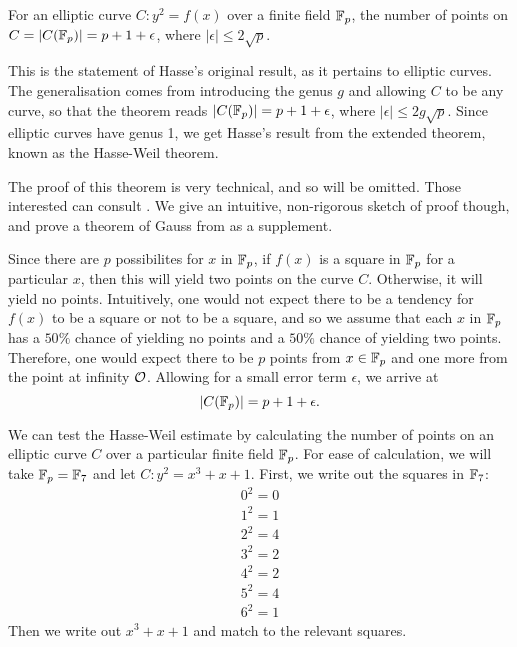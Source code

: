 
\begin{theorem}
	For an elliptic curve $C: y^2 = f(x)$ over a finite field $\fp$, the number of points on $C = |C(\fp)| = p + 1 + \epsilon$, where $|\epsilon| \leq 2\sqrt{p}$.
\end{theorem}
This is the statement of Hasse's original result, as it pertains to elliptic curves.
The generalisation comes from introducing the genus $g$ and allowing $C$ to be any curve, so that the theorem reads $|C(\fp)| = p + 1 + \epsilon$, where $|\epsilon| \leq 2g\sqrt{p}$.
Since elliptic curves have genus 1, we get Hasse's result from the extended theorem, known as the Hasse-Weil theorem.
\begin{sproof}
	The proof of this theorem is very technical, and so will be omitted.
	Those interested can consult \cite{hasse1936a,hasse1936b,hasse1936c}.
	We give an intuitive, non-rigorous sketch of proof though, and prove a theorem of Gauss from \cite{tate2013} as a supplement.

	Since there are $p$ possibilites for $x$ in $\fp$, if $f(x)$ is a square in $\fp$ for a particular $x$, then this will yield two points on the curve $C$.
	Otherwise, it will yield no points.
	Intuitively, one would not expect there to be a tendency for $f(x)$ to be a square or not to be a square, and so we assume that each $x$ in $\fp$ has a $50\%$ chance of yielding no points and a $50\%$ chance of yielding two points.
	Therefore, one would expect there to be $p$ points from $x \in \fp$ and one more from the point at infinity $\pai$.
	Allowing for a small error term $\epsilon$, we arrive at
	$$|C(\fp)| = p + 1 + \epsilon.$$
\end{sproof}
We can test the Hasse-Weil estimate by calculating the number of points on an elliptic curve $C$ over a particular finite field $\fp$.
For ease of calculation, we will take $\fp = \fp[7]$ and let $C : y^2 = x^3 + x + 1$.
First, we write out the squares in $\fp[7]$:
\begin{align*}
0^2 = 0\\
1^2 = 1\\
2^2 = 4\\
3^2 = 2\\
4^2 = 2\\
5^2 = 4\\
6^2 = 1
\end{align*}
Then we write out $x^3+x+1$ and match to the relevant squares.
